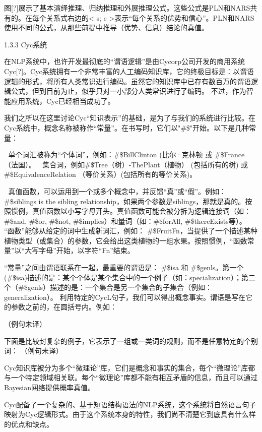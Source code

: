 图[?]展示了基本演绎推理、归纳推理和外展推理公式。这些公式是PLN和NARS共有的。在每个关系式右边的< s; c >表示“每个关系的优势和信心”。PLN和NARS使用不同的公式，从那些前提中推导（优势、信息）结论的真值。

1.3.3 Cyc系统

在NLP系统中，也许开发最彻底的“谓语逻辑”是由Cycorp公司开发的商用系统Cyc[?]。Cyc系统拥有一个非常丰富的人工编码知识库，它的终极目标是：以谓语逻辑的形式，将所有人类常识进行编码。虽然它的知识库中已存有数百万的谓语逻辑公式，但到目前为止，似乎只对一小部分人类常识进行了编码。 不过，作为智能应用系统，Cyc已经相当成功了。

我们之所以在这里讨论Cyc“知识表示”的基础，是为了与我们的系统进行比较。在Cyc系统中，概念名称被称作“常量”。在书写时，它们以"\#\$"开始。以下是几种常量：

	单个词汇被称为“个体词”，例如：\#\$BillClinton (比尔·克林顿 或 \#\$France（法国）。
	集合词，例如\#\$Tree（树）-ThePlant（植物） (包括所有的树) 或 \#\$EquivalenceRelation （等价关系）(包括所有的等价关系)。

	真值函数，可以运用到一个或多个概念中，并反馈“真”或“假”。例如：\#\$siblings is the sibling relationship，如果两个参数是siblings，那就是真的。按照惯例，真值函数以小写字母开头。真值函数可能会被分拆为逻辑连接词（如：\#\$and, \#\$or, \#\$not, \#\$implies）和量词（如：\#\$forAll, \#\$thereExists等）。
	“函数”能够从给定的词中生成新词汇，例如：
\#\$FruitFn，当提供了一个描述某种植物类型（或集合）的参数，它会给出这类植物的一组水果。按照惯例，“函数常量”以“大写字母”开始，以字符“Fn”结束。

“常量”之间由谓语联系在一起。最重要的谓语是： \#\$isa 和 \#\$genls。第一个(\#\$isa)描述的是：某个个体是某个集合中的一个例子（如：specialization）；第二个（\#\$genls）描述的是：一个集合是另一个集合的子集合（例如：generalization）。
利用特定的CycL句子，我们可以得出概念事实。谓语是写在它的参数之前的，在圆括号内。例如：

（例句未译）






下面是比较封复杂的例子，它表示了一组或一类词的规则，而不是任意特定的个别词：
（例句未译）






Cyc知识库被分为多个“微理论”库，它们是概念和事实的集合，每个“微理论”库都与一个特定领域相关联。每个“微理论”库都不能有相互矛盾的信息，而且可以通过Bayesian网络提供概率真值。

Cyc配备了一个复杂的、基于短语结构语法的NLP系统，这个系统将自然语言句子映射为Cyc逻辑形式。由于这个系统本身的特性，我们尚不清楚它到底具有什么样的优点和缺点。

